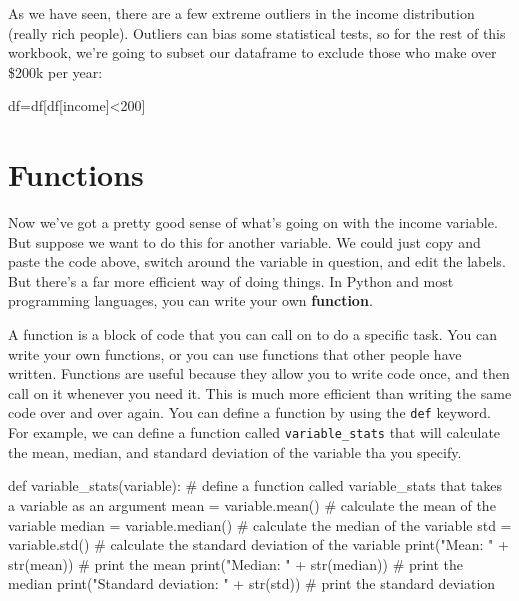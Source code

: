 \documentclass[
  letterpaper,
  DIV=11,
  numbers=noendperiod]{scrreprt}
\newenvironment{Shaded}{\begin{snugshade}}{\end{snugshade}}
\newcommand{\BuiltInTok}[1]{\textcolor[rgb]{0.00,0.23,0.31}{#1}}
\newcommand{\CommentTok}[1]{\textcolor[rgb]{0.37,0.37,0.37}{#1}}
\newcommand{\DecValTok}[1]{\textcolor[rgb]{0.68,0.00,0.00}{#1}}
\newcommand{\KeywordTok}[1]{\textcolor[rgb]{0.00,0.23,0.31}{#1}}
\newcommand{\NormalTok}[1]{\textcolor[rgb]{0.00,0.23,0.31}{#1}}
\newcommand{\OperatorTok}[1]{\textcolor[rgb]{0.37,0.37,0.37}{#1}}
\newcommand{\StringTok}[1]{\textcolor[rgb]{0.13,0.47,0.30}{#1}}
\begin{document}
As we have seen, there are a few extreme outliers in the income
distribution (really rich people). Outliers can bias some statistical
tests, so for the rest of this workbook, we're going to subset our
dataframe to exclude those who make over \$200k per year:

\begin{Shaded}
\begin{Highlighting}[]
\NormalTok{df}\OperatorTok{=}\NormalTok{df[df[}\StringTok{\textquotesingle{}income\textquotesingle{}}\NormalTok{]}\OperatorTok{\textless{}}\DecValTok{200}\NormalTok{]}
\end{Highlighting}
\end{Shaded}

\hypertarget{functions}{%
\section{Functions}\label{functions}}

Now we've got a pretty good sense of what's going on with the income
variable. But suppose we want to do this for another variable. We could
just copy and paste the code above, switch around the variable in
question, and edit the labels. But there's a far more efficient way of
doing things. In Python and most programming languages, you can write
your own \textbf{function}.

A function is a block of code that you can call on to do a specific
task. You can write your own functions, or you can use functions that
other people have written. Functions are useful because they allow you
to write code once, and then call on it whenever you need it. This is
much more efficient than writing the same code over and over again. You
can define a function by using the \texttt{def} keyword. For example, we
can define a function called \texttt{variable\_stats} that will
calculate the mean, median, and standard deviation of the variable tha
you specify.

\begin{Shaded}
\begin{Highlighting}[]
\KeywordTok{def}\NormalTok{ variable\_stats(variable): }\CommentTok{\# define a function called variable\_stats that takes a variable as an argument}
\NormalTok{    mean }\OperatorTok{=}\NormalTok{ variable.mean() }\CommentTok{\# calculate the mean of the variable}
\NormalTok{    median }\OperatorTok{=}\NormalTok{ variable.median() }\CommentTok{\# calculate the median of the variable}
\NormalTok{    std }\OperatorTok{=}\NormalTok{ variable.std() }\CommentTok{\# calculate the standard deviation of the variable}
    \BuiltInTok{print}\NormalTok{(}\StringTok{"Mean: "} \OperatorTok{+} \BuiltInTok{str}\NormalTok{(mean)) }\CommentTok{\# print the mean}
    \BuiltInTok{print}\NormalTok{(}\StringTok{"Median: "} \OperatorTok{+} \BuiltInTok{str}\NormalTok{(median)) }\CommentTok{\# print the median}
    \BuiltInTok{print}\NormalTok{(}\StringTok{"Standard deviation: "} \OperatorTok{+} \BuiltInTok{str}\NormalTok{(std)) }\CommentTok{\# print the standard deviation}
\end{Highlighting}
\end{Shaded}
\end{document}
